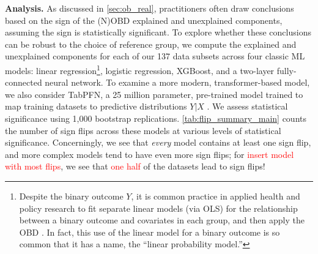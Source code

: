\textbf{Analysis.}
As discussed in \cref{sec:ob_real}, practitioners often draw conclusions based on the sign of the (N)OBD explained and unexplained components, assuming the sign is statistically significant.
To explore whether these conclusions can be robust to the choice of reference group, we compute the explained and unexplained components for each of our 137 data subsets across four classic ML models: linear regression\footnote{Despite the binary outcome $Y$, it is common practice in applied health and policy research to fit separate linear models (via OLS) for the relationship between a binary outcome and covariates in each group, and then apply the OBD \citep{jann2008, edokaChangesCatastrophicHealth2017, sujin_LPM_OB, mweembaGapSelfRatedHealth2023}. In fact, this use of the linear model for a binary outcome is so common that it has a name, the ``linear probability model.''}, logistic regression, XGBoost, and a two-layer fully-connected neural network.
To examine a more modern, transformer-based model, we also consider TabPFN, a 25 million parameter, pre-trained model trained to map training datasets to predictive distributions $Y|X$ \citep{hollmann2023tabpfn}.
We assess statistical significance using 1,000 bootstrap replications.
\cref{tab:flip_summary_main} counts the number of sign flips across these models at various levels of statistical significance.
Concerningly, we see that \emph{every} model contains at least one sign flip, and more complex models tend to have even more sign flips; for \textcolor{red}{insert model with most flips}, we see that \textcolor{red}{one half} of the datasets lead to sign flips!



